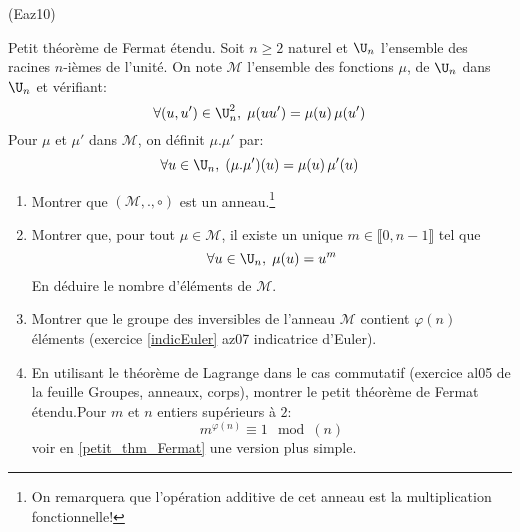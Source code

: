 \begin{tiny}(Eaz10)\end{tiny} Petit théorème de Fermat étendu.\newline \label{petit_thm_Fermat_et}
Soit $n\geq 2$ naturel et $\U_n$ l'ensemble des racines $n$-ièmes de l'unité. On note $\mathcal{M}$ l'ensemble des fonctions $\mu$, de $\U_n$ dans $\U_n$ et  vérifiant:
\begin{displaymath}
\forall (u,u') \in \U_n^2,\; \mu(uu') = \mu(u)\,\mu(u')  
\end{displaymath}
Pour $\mu$ et $\mu'$ dans $\mathcal{M}$, on définit $\mu . \mu'$ par:
\begin{displaymath}
\forall u \in \U_n,\;   (\mu . \mu')(u) = \mu(u)\, \mu'(u)
\end{displaymath}
\begin{enumerate}
  \item Montrer que $(\mathcal{M}, ., \circ)$ est un anneau.\footnote{On remarquera que l'opération additive de cet anneau est la multiplication fonctionnelle!}
  \item Montrer que, pour tout $\mu\in \mathcal{M}$, il existe un unique $m\in \llbracket 0, n-1\rrbracket$ tel que
\begin{displaymath}
  \forall u \in \U_n,\; \mu(u) = u^m
\end{displaymath}
En déduire le nombre d'éléments de $\mathcal{M}$.
  \item Montrer que le groupe des inversibles de l'anneau $\mathcal{M}$ contient $\varphi(n)$ éléments (exercice \ref{indicEuler} az07  indicatrice d'Euler).
  \item En utilisant le théorème de Lagrange dans le cas commutatif (exercice al05 de la feuille Groupes, anneaux, corps), montrer le petit théorème de Fermat étendu.\newline Pour $m$ et $n$ entiers supérieurs à $2$:
\begin{displaymath}
  m^{\varphi(n)} \equiv 1 \mod(n)
\end{displaymath}
voir en \ref{petit_thm_Fermat} une version plus simple.
\end{enumerate}
